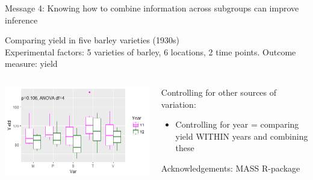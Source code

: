 \documentclass[10pt]{beamer}
\begin{document}
\begin{frame}{Message 4: Knowing how to combine information across subgroups  can improve inference}
 
  
 Comparing yield in five barley varieties (1930s) \\
 Experimental factors: 5 varieties of barley, 6 locations, 2 time points. Outcome measure: yield
  \begin{columns}
    \begin{column}{0.5\textwidth}
	\begin{center}
	\includegraphics[width=\textwidth]{Figures/message4b}
	\end{center}
    \end{column}
    
    \begin{column}{0.5\textwidth}
    \begin{block}{Controlling for other sources of variation:}
      \begin{itemize}
	\item Controlling for year = comparing yield WITHIN years and combining these
      \end{itemize}
      \end{block}
      \tiny Acknowledgements: MASS R-package
    \end{column}
  \end{columns}
   
\end{frame}
\end{document}
